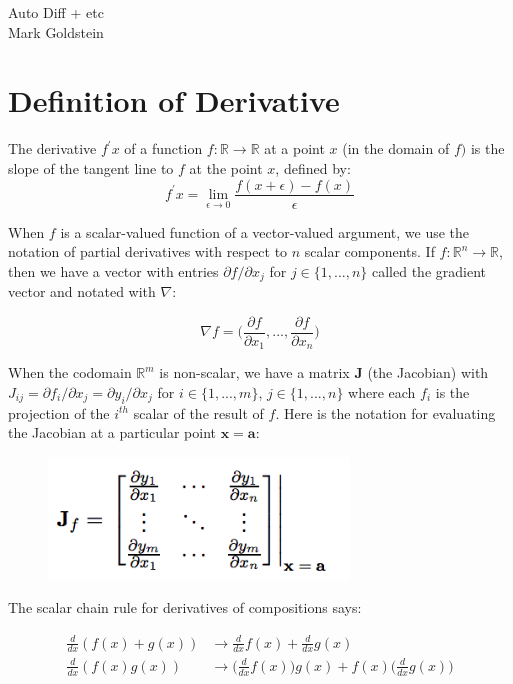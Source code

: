 \documentclass[11pt]{article}
\theoremstyle{definition}
\theoremstyle{plain}
\renewcommand{\v}[1]{\mathbf{#1}}
\renewcommand{\b}[1]{\mathbb{#1}}
\begin{document}
\begin{center}
Auto Diff + etc\\ 
Mark Goldstein
\end{center}


\section{Definition of Derivative}

\noindent The derivative $f^\prime x$ of a function $f: \b{R} \rightarrow \b{R}$
at a point $x$ (in the domain of $f)$ is the slope of the tangent line to $f$
at the point $x$, defined by:
$$ f^\prime x = \lim_{\epsilon \rightarrow 0} \frac{f(x+\epsilon) - f(x)}{\epsilon} $$

\noindent When $f$ is a scalar-valued function of a vector-valued argument, 
we use the notation of partial derivatives with respect to $n$ scalar components. 
If $f: \b{R}^n \rightarrow \b{R}$, then we have a vector with entries 
$\partial f / \partial x_j$ for $j \in \{1,...,n\}$
called the gradient vector and notated with $\nabla$:

$$ \nabla f = \Big( \frac{\partial f}{\partial x_1},...,\frac{\partial f}{\partial x_n} \Big )$$

\noindent When the codomain $\b{R}^m$ is non-scalar, we have a matrix $\v{J}$ (the Jacobian)
with $J_{ij} = \partial f_i / \partial x_j = \partial y_i / \partial x_j$ for 
$i \in \{1,...,m\}$, $j \in \{1,...,n\}$  where each $f_i$ is the projection of the $i^{th}$ 
scalar of the result of $f$. Here is the notation for evaluating the Jacobian at a 
particular point $\v{x}=\v{a}$:

\begin{figure}[H]
\includegraphics[width=8cm]{jacobian}
\centering
\end{figure}

\noindent The scalar chain rule for derivatives of compositions says:

\begin{align*}
    \frac{d}{dx}(f(x)+g(x)) &\rightarrow \frac{d}{dx}f(x) + \frac{d}{dx}g(x)\\
    \frac{d}{dx}(f(x)g(x)) &\rightarrow \Big(\frac{d}{dx} f(x) \Big)g(x) +
                                        f(x)\Big(\frac{d}{dx}g(x) \Big)
\end{align*}
\end{document}
